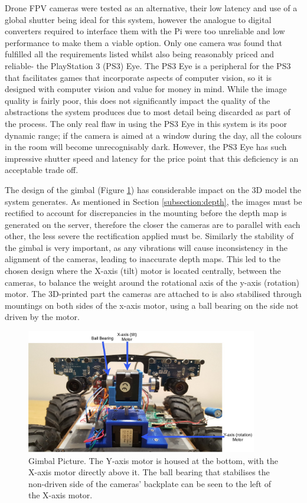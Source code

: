 Drone FPV cameras were tested as an alternative, their low latency and use of a global shutter being ideal for this system, however the analogue to digital converters required to interface them with the Pi were too unreliable and low performance to make them a viable option. Only one camera was found that fulfilled all the requirements listed whilst also being reasonably priced and reliable- the PlayStation 3 (PS3) Eye. The PS3 Eye is a peripheral for the PS3 that facilitates games that incorporate aspects of computer vision, so it is designed with computer vision and value for money in mind. While the image quality is fairly poor, this does not significantly impact the quality of the abstractions the system produces due to most detail being discarded as part of the process. The only real flaw in using the PS3 Eye in this system is its poor dynamic range; if the camera is aimed at a window during the day, all the colours in the room will become unrecognisably dark. However, the PS3 Eye has such impressive shutter speed and latency for the price point that this deficiency is an acceptable trade off.

The design of the gimbal (Figure \ref{fig:gimble}) has considerable impact on the 3D model the system generates. As mentioned in Section \ref{subsection:depth}, the images must be rectified to account for discrepancies in the mounting before the depth map is generated on the server, therefore the closer the cameras are to parallel with each other, the less severe the rectification applied must be. Similarly the stability of the gimbal is very important, as any vibrations will cause inconsistency in the alignment of the cameras, leading to inaccurate depth maps. This led to the chosen design where the X-axis (tilt) motor is located centrally, between the cameras, to balance the weight around the rotational axis of the y-axis (rotation) motor. The 3D-printed part the cameras are attached to is also stabilised through mountings on both sides of the x-axis motor, using a ball bearing on the side not driven by the motor. 

\begin{figure}[H]
    \begin{center}
      \includegraphics[width=0.9\textwidth]{Figures/GimbleLabel.jpg}
      \caption[Gimbal Picture]{Gimbal Picture. The Y-axis motor is housed at the bottom, with the X-axis motor directly above it. The ball bearing that stabilises the non-driven side of the cameras' backplate can be seen to the left of the X-axis motor.}
      \label{fig:gimble}
    \end{center}
\end{figure}

